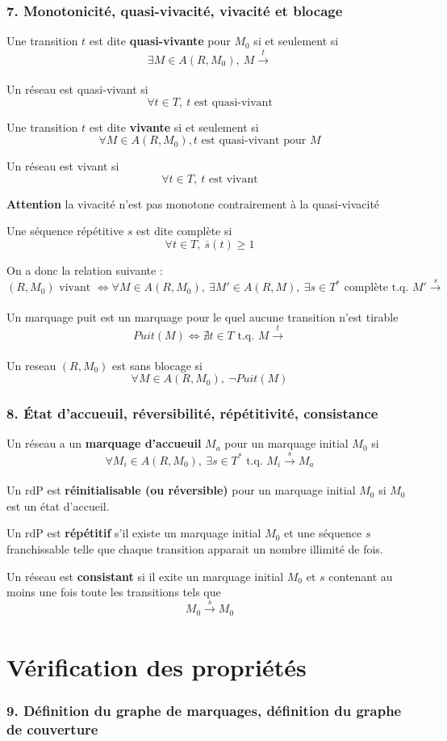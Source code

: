 \documentclass[12pt,a4paper,oneside]{article}
\begin{document}
	\subsubsection*{7. Monotonicité, quasi-vivacité, vivacité et blocage}

		Une transition $t$ est dite \textbf{quasi-vivante} pour $M_0$ si et seulement si
		$$\exists M \in A(R,M_0),\ M \xrightarrow[]{t}$$

		Un réseau est quasi-vivant si
		$$\forall t \in T,\ t \textrm{ est quasi-vivant}$$

		Une transition $t$ est dite \textbf{vivante} si et seulement si
		$$\forall M \in A(R,M_0), t \textrm{ est quasi-vivant pour } M$$

		Un réseau est vivant si
		$$\forall t \in T,\ t \textrm{ est vivant}$$

		\textbf{Attention} la vivacité n'est pas monotone contrairement à la quasi-vivacité

		Une séquence répétitive $s$ est dite complète si
		$$\forall t \in T,\ \overline{s}(t) \geq 1$$

		On a donc la relation suivante :
		$$(R, M_0) \textrm{ vivant } \iff
		\forall M \in A(R,M_0),\
		\exists M' \in A(R,M),\
		\exists s \in T^* \textrm{ complète t.q. }
		M' \xrightarrow[]{s}$$

		Un marquage puit est un marquage pour le quel aucune transition n'est tirable
		$$Puit(M) \iff \nexists t \in T \textrm{ t.q. } M \xrightarrow[]{t}$$

		Un reseau $(R,M_0)$ est sans blocage si
		$$\forall M \in A(R,M_0),\ \neg Puit(M)$$

	\subsubsection*{8. État d'accueuil, réversibilité, répétitivité, consistance}

		Un réseau a un \textbf{marquage d'accueuil} $M_a$ pour un marquage initial $M_0$ si
		$$\forall M_i \in A(R,M_0),\ \exists s \in T^* \textrm{ t.q. } M_i \xrightarrow[]{s} M_a$$

		Un rdP est \textbf{réinitialisable (ou réversible)} pour un marquage initial $M_0$ si $M_0$ est un état d'accueil.

		Un rdP est \textbf{répétitif} s'il existe un marquage initial $M_0$ et une séquence $s$ franchissable telle que chaque transition apparait un nombre illimité de fois.

		Un réseau est \textbf{consistant} si il exite un marquage initial $M_0$ et $s$ contenant au moins une fois toute les transitions tels que
		$$M_0 \xrightarrow[]{s} M_0$$

\section{Vérification des propriétés}
	\subsubsection*{9. Définition du graphe de marquages, définition du graphe de couverture}
\end{document}
